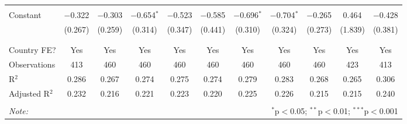 \begin{table}[!htbp]
\begin{tabular}{@{\extracolsep{5pt}}lcccccccccc}
  & & & & & & & & & & \\ 
 Constant & $-$0.322 & $-$0.303 & $-$0.654$^{*}$ & $-$0.523 & $-$0.585 & $-$0.696$^{*}$ & $-$0.704$^{*}$ & $-$0.265 & 0.464 & $-$0.428 \\ 
  & (0.267) & (0.259) & (0.314) & (0.347) & (0.441) & (0.310) & (0.324) & (0.273) & (1.839) & (0.381) \\ 
  & & & & & & & & & & \\ 
\hline \\[-1.8ex] 
Country FE? & Yes & Yes & Yes & Yes & Yes & Yes & Yes & Yes & Yes & Yes \\ 
Observations & 413 & 460 & 460 & 460 & 460 & 460 & 460 & 460 & 423 & 413 \\ 
R$^{2}$ & 0.286 & 0.267 & 0.274 & 0.275 & 0.274 & 0.279 & 0.283 & 0.268 & 0.265 & 0.306 \\ 
Adjusted R$^{2}$ & 0.232 & 0.216 & 0.221 & 0.223 & 0.220 & 0.225 & 0.226 & 0.215 & 0.215 & 0.240 \\ 
\hline 
\hline \\[-1.8ex] 
\textit{Note:}  & \multicolumn{10}{r}{$^{*}$p$<$0.05; $^{**}$p$<$0.01; $^{***}$p$<$0.001} \\ 
\end{tabular} 
\end{table} 
